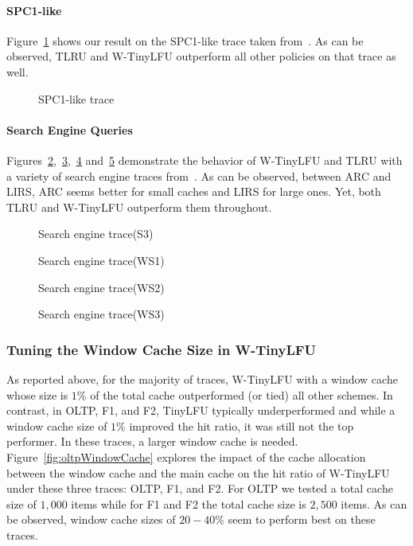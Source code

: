 \documentclass[10pt,a4paper]{article}
\begin{document}
\paragraph*{SPC1-like}
Figure~\ref{fig:SPClike} shows our result on the SPC1-like trace taken from~\cite{ARC}.
As can be observed, TLRU and W-TinyLFU outperform all other policies on that trace as well.
\begin{figure}[t]
	\caption{SPC1-like trace}
	\label{fig:SPClike}
\end{figure}

\paragraph*{Search Engine Queries}
Figures~\ref{fig:search},~\ref{fig:search1},~\ref{fig:search2} and~\ref{fig:search3} demonstrate the behavior of W-TinyLFU and TLRU with a variety of search engine traces from~\cite{ARC,UMAS}.
As can be observed, between ARC and LIRS, ARC seems better for small caches and LIRS for large ones.
Yet, both TLRU and W-TinyLFU outperform them throughout.

\begin{figure}[t]
	\caption{Search engine trace(S3)}
	\label{fig:search}
\end{figure}
\begin{figure}[t]
	\caption{Search engine trace(WS1)}
	\label{fig:search1}
\end{figure}
\begin{figure}[t]
	\caption{Search engine trace(WS2)}
	\label{fig:search2}
\end{figure}
\begin{figure}[t]
	\caption{Search engine trace(WS3)}
	\label{fig:search3}
\end{figure}

\subsubsection{Tuning the Window Cache Size in W-TinyLFU}
\label{sec:window-tuning}

As reported above, for the majority of traces, W-TinyLFU with a window cache whose size is $1\%$ of the total cache outperformed (or tied) all other schemes.
In contrast, in OLTP, F1, and F2, TinyLFU typically underperformed and while a window cache size of $1\%$ improved the hit ratio, it was still not the top performer.
In these traces, a larger window cache is needed.
Figure~\ref{fig:oltpWindowCache} explores the impact of the cache allocation between the window cache and the main cache on the hit ratio of W-TinyLFU under these three traces: OLTP, F1, and F2.
For OLTP we tested a total cache size of $1,000$ items while for F1 and F2 the total cache size is $2,500$ items.
As can be observed, window cache sizes of $20-40\%$ seem to perform best on these traces.
\end{document}
